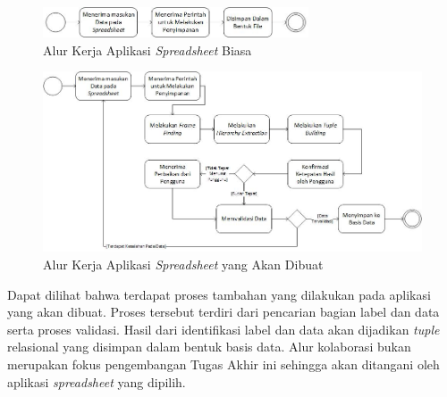 	\begin{figure}[htb]
	    \centering
	    \includegraphics[width=0.7\textwidth]{resources/chapter-3-workflow-biasa.jpg}
	    \caption{Alur Kerja Aplikasi \textit{Spreadsheet} Biasa}
		\label{GambarWorkflowBiasa}
	\end{figure}

	\begin{figure}[htb]
	    \centering
	    \includegraphics[width=1\textwidth]{resources/chapter-3-workflow.jpg}
	    \caption{Alur Kerja Aplikasi \textit{Spreadsheet} yang Akan Dibuat}
		\label{GambarWorkflow}
	\end{figure}

Dapat dilihat bahwa terdapat proses tambahan yang dilakukan pada aplikasi yang akan dibuat. Proses tersebut terdiri dari pencarian bagian label dan data serta proses validasi. Hasil dari identifikasi label dan data akan dijadikan \textit{tuple} relasional yang disimpan dalam bentuk basis data. Alur kolaborasi bukan merupakan fokus pengembangan Tugas Akhir ini sehingga akan ditangani oleh aplikasi \textit{spreadsheet} yang dipilih.

